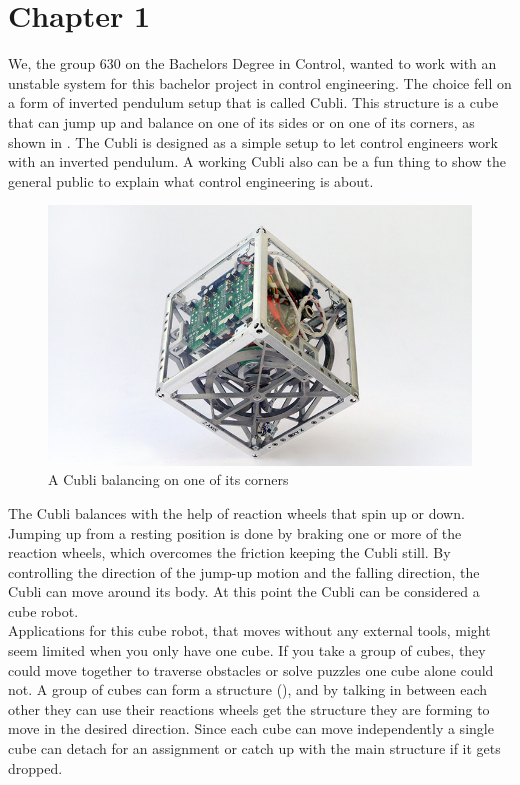 \chapter{Chapter 1}
We, the group 630 on the Bachelors Degree in Control, wanted to work with an unstable system for this bachelor project in control engineering. The choice fell on a form of inverted pendulum setup that is called Cubli. This structure is a cube that can jump up and balance on one of its sides or on one of its corners, as shown in .
The Cubli is designed as a simple setup to let control engineers work with an inverted pendulum. A working Cubli also can be a fun thing to show the general public to explain what control engineering is about.  \cite{MGajamohan}

\begin{figure}[H] 
	\centering 
	\includegraphics[scale=1.3]{figures/CubliCorner-700x430}
	\caption{A Cubli balancing on one of its corners\cite{RAndrea}}
	\label{CubliCorner}
\end{figure} 
The Cubli balances with the help of reaction wheels that spin up or down. Jumping up from a resting position is done by braking one or more of the reaction wheels, which overcomes the friction keeping the Cubli still. 
By controlling the direction of the jump-up motion and the falling direction, the Cubli can move around its body. At this point the Cubli can be considered a cube robot.\\
Applications for this cube robot, that moves without any external tools, might seem limited when you only have one cube. If you take a group of cubes, they could move together to traverse obstacles or solve puzzles one cube alone could not. A group of cubes can form a structure (), and by talking in between each other they can use their reactions wheels get the structure they are forming to move in the desired direction. Since each cube can move independently a single cube can detach for an assignment or catch up with the main structure if it gets dropped.\cite{JRomanishin}


